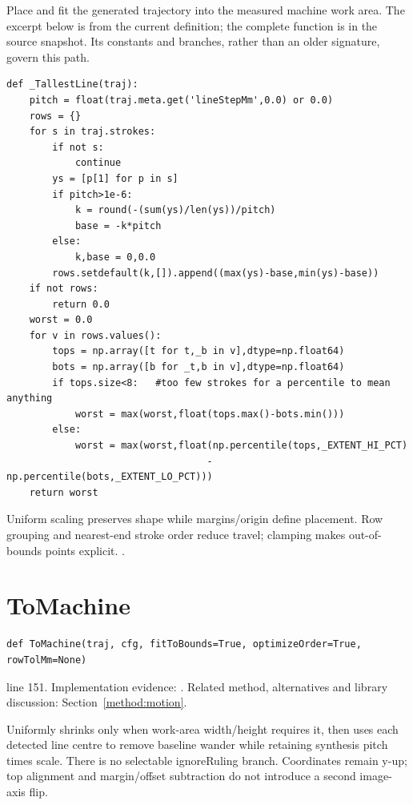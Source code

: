 Place and fit the generated trajectory into the measured machine work area. The excerpt below is from the current definition; the complete function is in the source snapshot. Its constants and branches, rather than an older signature, govern this path.


\begin{lstlisting}[style=plain]
def _TallestLine(traj):
    pitch = float(traj.meta.get('lineStepMm',0.0) or 0.0)
    rows = {}
    for s in traj.strokes:
        if not s:
            continue
        ys = [p[1] for p in s]
        if pitch>1e-6:
            k = round(-(sum(ys)/len(ys))/pitch)
            base = -k*pitch
        else:
            k,base = 0,0.0
        rows.setdefault(k,[]).append((max(ys)-base,min(ys)-base))
    if not rows:
        return 0.0
    worst = 0.0
    for v in rows.values():
        tops = np.array([t for t,_b in v],dtype=np.float64)
        bots = np.array([b for _t,b in v],dtype=np.float64)
        if tops.size<8:   #too few strokes for a percentile to mean anything
            worst = max(worst,float(tops.max()-bots.min()))
        else:
            worst = max(worst,float(np.percentile(tops,_EXTENT_HI_PCT)
                                   -np.percentile(bots,_EXTENT_LO_PCT)))
    return worst
\end{lstlisting}
Uniform scaling preserves shape while margins/origin define placement. Row grouping and nearest-end stroke order reduce travel; clamping makes out-of-bounds points explicit. \cite{bresenham1965,code2026}.


\section{ToMachine}\label{fn:reproduce:ToMachine}
\begin{lstlisting}[style=sig]
def ToMachine(traj, cfg, fitToBounds=True, optimizeOrder=True, rowTolMm=None)
\end{lstlisting}
 line 151. Implementation evidence: \cite{code2026}. Related method, alternatives and library discussion: Section~\ref{method:motion}.


Uniformly shrinks only when work-area width/height requires it, then uses each detected line centre to remove baseline wander while retaining synthesis pitch times scale. There is no selectable ignoreRuling branch. Coordinates remain y-up; top alignment and margin/offset subtraction do not introduce a second image-axis flip.


